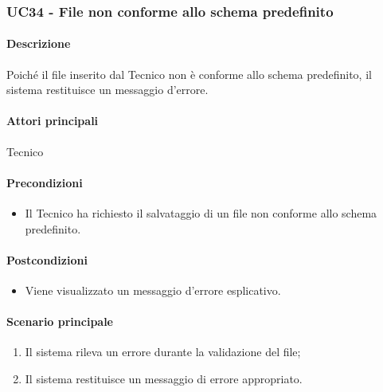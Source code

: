 \subsubsection{UC34 - File non conforme allo schema predefinito}\label{UC34}
\paragraph*{Descrizione}
Poiché il file inserito dal Tecnico non è conforme allo schema predefinito, il sistema restituisce un messaggio d'errore.

\paragraph*{Attori principali}
Tecnico

\paragraph*{Precondizioni}
\begin{itemize}
  \item Il Tecnico ha richiesto il salvataggio di un file non conforme allo schema predefinito.
\end{itemize}

\paragraph*{Postcondizioni}
\begin{itemize}
  \item Viene visualizzato un messaggio d'errore esplicativo.
\end{itemize}

\paragraph*{Scenario principale}
\begin{enumerate}
  \item Il sistema rileva un errore durante la validazione del file;
  \item Il sistema restituisce un messaggio di errore appropriato.
\end{enumerate}
